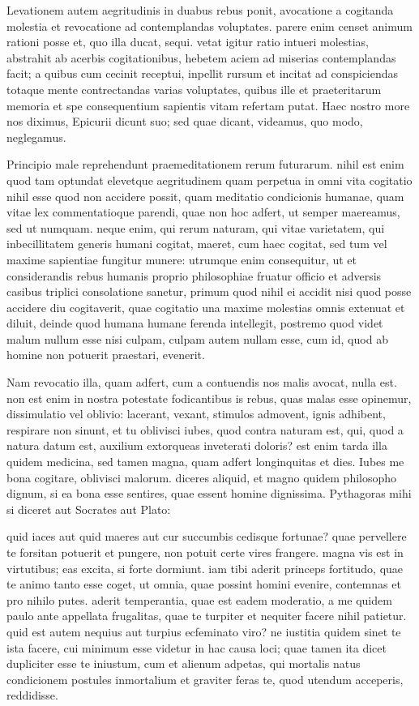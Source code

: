  Levationem autem aegritudinis in duabus rebus ponit, avocatione a cogitanda molestia et revocatione ad contemplandas voluptates. parere enim censet animum rationi posse et, quo illa ducat, sequi. vetat igitur ratio intueri molestias, abstrahit ab acerbis cogitationibus, hebetem aciem ad miserias contemplandas facit; a quibus cum cecinit receptui, inpellit rursum et incitat ad conspiciendas totaque mente contrectandas varias voluptates, quibus ille et praeteritarum memoria et spe consequentium sapientis vitam refertam putat. Haec nostro more nos diximus, Epicurii dicunt suo; sed quae dicant, videamus, quo modo, neglegamus.

 Principio male reprehendunt praemeditationem rerum futurarum. nihil est enim quod tam optundat elevetque aegritudinem quam perpetua in omni vita cogitatio nihil esse quod non accidere possit, quam meditatio condicionis humanae, quam vitae lex commentatioque parendi, quae non hoc adfert, ut semper maereamus, sed ut numquam. neque enim, qui rerum naturam, qui vitae varietatem, qui inbecillitatem generis humani cogitat, maeret, cum haec cogitat, sed tum vel maxime sapientiae fungitur munere: utrumque enim consequitur, ut et considerandis rebus humanis proprio philosophiae fruatur officio et adversis casibus triplici consolatione sanetur, primum quod nihil ei accidit nisi quod posse accidere diu cogitaverit, quae cogitatio una maxime molestias omnis extenuat et diluit, deinde quod humana humane ferenda intellegit, postremo quod videt malum nullum esse nisi culpam, culpam autem nullam esse, cum id, quod ab homine non potuerit praestari, evenerit.

 Nam revocatio illa, quam adfert, cum a contuendis nos malis avocat, nulla est. non est enim in nostra potestate fodicantibus is rebus, quas malas esse opinemur, dissimulatio vel oblivio: lacerant, vexant, stimulos admovent, ignis adhibent, respirare non sinunt, et tu oblivisci iubes, quod contra naturam est, qui, quod a natura datum est, auxilium extorqueas inveterati doloris? est enim tarda illa quidem medicina, sed tamen magna, quam adfert longinquitas et dies. Iubes me bona cogitare, oblivisci malorum. diceres aliquid, et magno quidem philosopho dignum, si ea bona esse sentires, quae essent homine dignissima. Pythagoras mihi si diceret aut Socrates aut Plato:

 quid iaces aut quid maeres aut cur succumbis cedisque fortunae? quae pervellere te forsitan potuerit et pungere, non potuit certe vires frangere. magna vis est in virtutibus; eas excita, si forte dormiunt. iam tibi aderit princeps fortitudo, quae te animo tanto esse coget, ut omnia, quae possint homini evenire, contemnas et pro nihilo putes. aderit temperantia, quae est eadem moderatio, a me quidem paulo ante appellata frugalitas, quae te turpiter et nequiter facere nihil patietur. quid est autem nequius aut turpius ecfeminato viro? ne iustitia quidem sinet te ista facere, cui minimum esse videtur in hac causa loci; quae tamen ita dicet dupliciter esse te iniustum, cum et alienum adpetas, qui mortalis natus condicionem postules inmortalium et graviter feras te, quod utendum acceperis, reddidisse.

